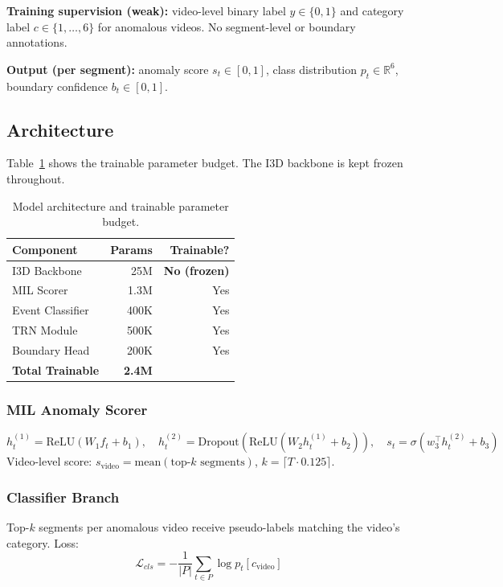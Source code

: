 \documentclass[11pt]{article}
\begin{document}
\textbf{Training supervision (weak):} video-level binary label $y \in \{0,1\}$ and category label $c \in \{1,\ldots,6\}$ for anomalous videos. No segment-level or boundary annotations.

\textbf{Output (per segment):} anomaly score $s_t \in [0,1]$, class distribution $p_t \in \mathbb{R}^6$, boundary confidence $b_t \in [0,1]$.

\subsection{Architecture}

Table~\ref{tab:params} shows the trainable parameter budget. The I3D backbone is kept frozen throughout.

\begin{table}[h]
\centering
\small
\begin{tabular}{lrr}
\toprule
\textbf{Component} & \textbf{Params} & \textbf{Trainable?} \\
\midrule
I3D Backbone     & 25M   & \textbf{No (frozen)} \\
MIL Scorer       & 1.3M  & Yes \\
Event Classifier & 400K  & Yes \\
TRN Module       & 500K  & Yes \\
Boundary Head    & 200K  & Yes \\
\midrule
\textbf{Total Trainable} & \textbf{2.4M} & \\
\bottomrule
\end{tabular}
\caption{Model architecture and trainable parameter budget.}
\label{tab:params}
\end{table}

\subsubsection{MIL Anomaly Scorer}
\begin{equation}
h^{(1)}_t = \text{ReLU}(W_1 f_t + b_1), \quad
h^{(2)}_t = \text{Dropout}(\text{ReLU}(W_2 h^{(1)}_t + b_2)), \quad
s_t = \sigma(w_3^\top h^{(2)}_t + b_3)
\end{equation}
Video-level score: $s_\text{video} = \text{mean}(\text{top-}k \text{ segments})$, $k = \lceil T \cdot 0.125 \rceil$.

\subsubsection{Classifier Branch}
Top-$k$ segments per anomalous video receive pseudo-labels matching the video's category. Loss:
\begin{equation}
\mathcal{L}_{cls} = -\frac{1}{|P|} \sum_{t \in P} \log p_t[c_\text{video}]
\end{equation}
\end{document}
